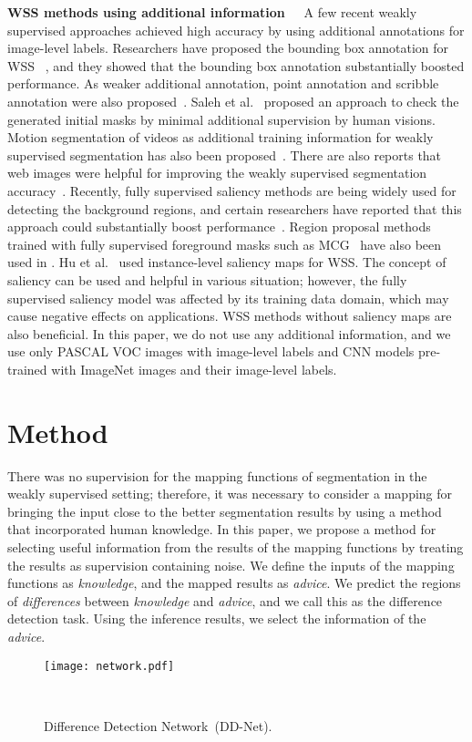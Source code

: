 \documentclass[10pt,twocolumn,letterpaper]{article}
\begin{document}
\noindent
{\bf WSS methods using additional information~~}
A few recent weakly supervised approaches achieved high accuracy
by using additional annotations for image-level labels. 
Researchers have proposed the bounding box annotation for WSS
~\cite{papa15},
and they showed that the bounding box annotation substantially boosted performance.
As weaker additional annotation, 
point annotation and scribble annotation were also proposed~\cite{point}.
Saleh et al.~\cite{bfb} proposed an approach to check the generated
initial masks by minimal additional
supervision by human visions.
Motion segmentation of videos
as additional training information for weakly supervised segmentation has also been proposed~\cite{mcue,webvideo-seg}.
There are also reports that web images were helpful for improving the weakly supervised segmentation accuracy~\cite{ped15,stc,cvpr17web,cvpr18web}.
Recently, fully supervised saliency methods are being widely used for detecting the background regions, and certain researchers have reported that 
this approach could substantially boost performance~\cite{joon17cvpr, erasing, mdc, dsrg, seenet, mcof, dcsp}.
Region proposal methods trained with fully supervised foreground masks such as MCG~\cite{mcg} have also been used in \cite{ped15,afss}.
Hu et al.~\cite{salins} used instance-level saliency maps for WSS.
The concept of saliency can be used and helpful in various situation; however, the fully supervised saliency model was affected by its training data domain, which may cause negative effects on applications.
WSS methods without saliency maps are also beneficial.
In this paper, we do not use any additional information, and we use only PASCAL VOC images with image-level labels and CNN models pre-trained with ImageNet images and their image-level labels.

\section{Method\label{method}}
There was no supervision for the mapping functions of segmentation in the weakly supervised setting; therefore, it was necessary to consider a mapping for bringing the input close to the better segmentation results by using a method that incorporated human knowledge.
In this paper, we propose a method for selecting useful information from the results of the mapping functions by treating the results as supervision containing noise.
We define the inputs of the mapping functions as {\it knowledge}, and the mapped results as {\it advice}.
We predict the regions of {\it differences} between {\it knowledge} and {\it advice},
and we call this as the difference detection task. 
Using the inference results, we select the information of the {\it advice}.
\begin{figure}[tb]
\begin{center}
\texttt{[image: network.pdf]}
\caption{Difference Detection Network~(DD-Net).} \label{fig_network}
\vskip -5mm~
\end{center}
\end{figure}
\end{document}
